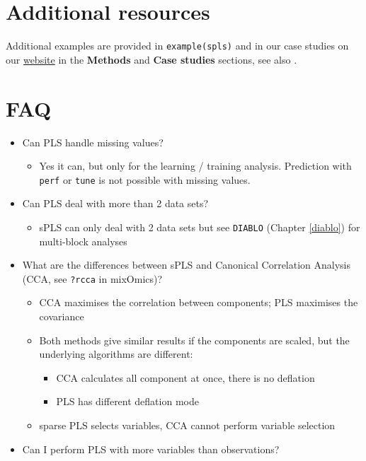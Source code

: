 \documentclass[]{book}
\providecommand{\tightlist}{%
  \setlength{\itemsep}{0pt}\setlength{\parskip}{0pt}}
\begin{document}
\hypertarget{additional-resources-2}{%
\section{Additional resources}\label{additional-resources-2}}

Additional examples are provided in \texttt{example(spls)} and in our case studies on our \href{http://www.mixomics.org}{website} in the \textbf{Methods} and \textbf{Case studies} sections, see also \citep{Lec08, Lec09a}.

\hypertarget{faq-2}{%
\section{FAQ}\label{faq-2}}

\begin{itemize}
\tightlist
\item
  Can PLS handle missing values?

  \begin{itemize}
  \tightlist
  \item
    Yes it can, but only for the learning / training analysis. Prediction with \texttt{perf} or \texttt{tune} is not possible with missing values.
  \end{itemize}
\item
  Can PLS deal with more than 2 data sets?

  \begin{itemize}
  \tightlist
  \item
    sPLS can only deal with 2 data sets but see \texttt{DIABLO} (Chapter \ref{diablo}) for multi-block analyses
  \end{itemize}
\item
  What are the differences between sPLS and Canonical Correlation Analysis (CCA, see \texttt{?rcca} in mixOmics)?

  \begin{itemize}
  \tightlist
  \item
    CCA maximises the correlation between components; PLS maximises the covariance
  \item
    Both methods give similar results if the components are scaled, but the underlying algorithms are different:

    \begin{itemize}
    \tightlist
    \item
      CCA calculates all component at once, there is no deflation
    \item
      PLS has different deflation mode
    \end{itemize}
  \item
    sparse PLS selects variables, CCA cannot perform variable selection
  \end{itemize}
\item
  Can I perform PLS with more variables than observations?


\end{itemize}
\end{document}
